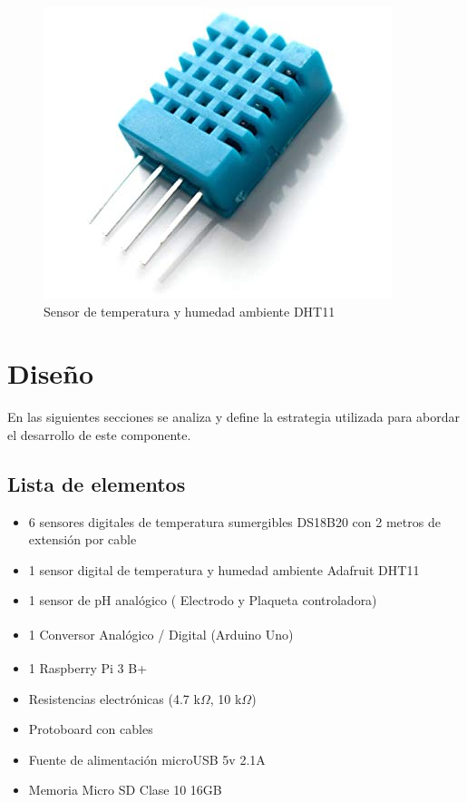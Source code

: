                 \begin{figure} [h]
                    \centering
                    \includegraphics[scale=0.35]{hardware/dht11_.jpg}
                    \caption{Sensor de temperatura y humedad ambiente DHT11}
                    \label{SensorDHT11}
                \end{figure}

        
\section{Diseño}
    \par En las siguientes secciones se analiza y define la estrategia utilizada para abordar el desarrollo de este componente.
    
    \subsection{Lista de elementos}
        \begin{itemize}
            \item 6 sensores digitales de temperatura sumergibles DS18B20 con 2 metros de extensión por cable
            \item 1 sensor digital de temperatura y humedad ambiente Adafruit DHT11
            \item 1 sensor de pH analógico ( Electrodo y Plaqueta controladora)
            \item 1 Conversor Analógico / Digital (Arduino\textsuperscript{\textregistered} Uno)
            \item 1 Raspberry\textsuperscript{\textregistered} Pi 3 B+
            \item Resistencias electrónicas (4.7 k$\Omega$, 10 k$\Omega$)
            \item Protoboard con cables
            \item Fuente de alimentación microUSB 5v 2.1A
            \item Memoria Micro SD Clase 10 16GB
        \end{itemize}
        
